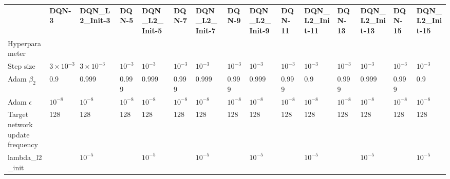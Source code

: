 \begin{tabular}{lllllllllllllll}
 & \bfseries DQN-3 & \bfseries DQN_L2_Init-3 & \bfseries DQN-5 & \bfseries DQN_L2_Init-5 & \bfseries DQN-7 & \bfseries DQN_L2_Init-7 & \bfseries DQN-9 & \bfseries DQN_L2_Init-9 & \bfseries DQN-11 & \bfseries DQN_L2_Init-11 & \bfseries DQN-13 & \bfseries DQN_L2_Init-13 & \bfseries DQN-15 & \bfseries DQN_L2_Init-15 \\
Hyperparameter &  &  &  &  &  &  &  &  &  &  &  &  &  &  \\
Step size & $3 \times 10^{-3}$ & $3 \times 10^{-3}$ & $10^{-3}$ & $10^{-3}$ & $10^{-3}$ & $10^{-3}$ & $10^{-3}$ & $10^{-3}$ & $10^{-3}$ & $10^{-3}$ & $10^{-3}$ & $10^{-3}$ & $10^{-3}$ & $10^{-3}$ \\
Adam $\beta_2$ & 0.9 & 0.999 & 0.999 & 0.999 & 0.999 & 0.999 & 0.999 & 0.999 & 0.999 & 0.9 & 0.999 & 0.999 & 0.999 & 0.9 \\
Adam $\epsilon$ & $10^{-8}$ & $10^{-8}$ & $10^{-8}$ & $10^{-8}$ & $10^{-8}$ & $10^{-8}$ & $10^{-8}$ & $10^{-8}$ & $10^{-8}$ & $10^{-8}$ & $10^{-8}$ & $10^{-8}$ & $10^{-8}$ & $10^{-8}$ \\
Target network update frequency & 128 & 128 & 128 & 128 & 128 & 128 & 128 & 128 & 128 & 128 & 128 & 128 & 128 & 128 \\
lambda_l2_init &  & $10^{-5}$ &  & $10^{-5}$ &  & $10^{-5}$ &  & $10^{-5}$ &  & $10^{-5}$ &  & $10^{-5}$ &  & $10^{-5}$ \\
\end{tabular}
